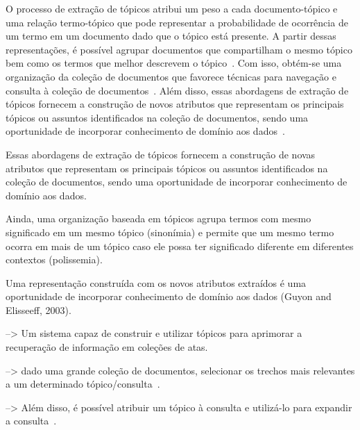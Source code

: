 O processo de extração de tópicos atribui um peso a cada documento-tópico e uma relação termo-tópico que pode representar a probabilidade de ocorrência de um termo em um documento dado que o tópico está presente. A partir dessas representações, é possível agrupar documentos que compartilham o mesmo tópico bem como os termos que melhor descrevem o tópico~\cite{Aggarwal2018}. Com isso, obtém-se uma organização da coleção de documentos que favorece técnicas para navegação e consulta à coleção de documentos~\cite{Maracini2010}. 
% 
Além disso, essas abordagens de extração de tópicos fornecem a construção de novos atributos que representam os principais tópicos ou assuntos identificados na coleção de documentos, sendo uma oportunidade de incorporar conhecimento de domínio aos dados~\cite{Guyon2003}. 























Essas abordagens de extração de tópicos fornecem a construção de novas atributos que representam os principais tópicos ou assuntos identificados na coleção de documentos, sendo uma oportunidade de incorporar conhecimento de domínio aos dados. 

Ainda, uma organização baseada em tópicos agrupa termos com mesmo significado em um mesmo tópico (sinonímia) e permite que um mesmo termo ocorra em mais de um tópico caso ele possa ter significado diferente em diferentes contextos (polissemia). 


Uma representação construída com os novos atributos extraídos é uma oportunidade de incorporar conhecimento de domínio aos dados (Guyon and Elisseeff, 2003).




--> { Um sistema capaz de construir e utilizar tópicos para aprimorar a recuperação de informação em coleções de atas. }

--> { dado uma grande coleção de documentos, selecionar os trechos mais relevantes a um determinado tópico/consulta~\cite{Zhai2017}. }

--> Além disso, é possível atribuir um tópico à consulta e utilizá-lo para expandir a consulta~\cite{Xing2009}. 

